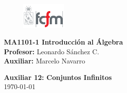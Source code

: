 \documentclass[letterpaper,11pt]{article}
\theoremstyle{plain}
\begin{document}
\newpage
\pagestyle{fancy}
\fancyhf{}

\begin{figure} %
    \vspace{-5mm}
    \includegraphics[width=0.2\textwidth]{img/fcfm2.png}
\end{figure}


\noindent
\textbf{MA1101-1 Introducción al Álgebra}\\
\textbf{Profesor: }Leonardo Sánchez C.\\
\textbf{Auxiliar: }Marcelo Navarro

\begin{center}
{\bf \Large Auxiliar 12: Conjuntos Infinitos}\\
{\today}
\end{center}
\end{document}
